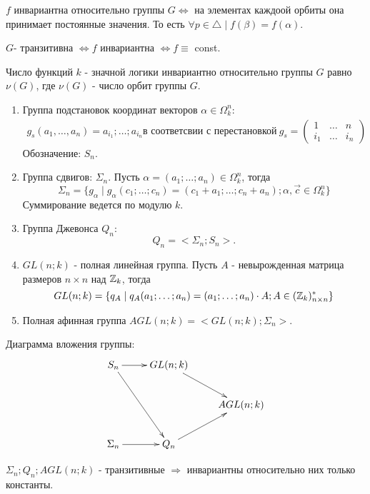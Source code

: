 \utv $f$ инвариантна относительно группы $G \Leftrightarrow$ на элементах каждоой орбиты она принимает постоянные значения.
То есть $\forall p \in \bigtriangleup \mid f(\beta) = f(\alpha)$.

\conseq $G$- транзитивна $\Leftrightarrow f$ инвариантна $\Leftrightarrow f \equiv$ const.

\conseq Число функций $k$ - значной логики инвариантно относительно группы $G$ равно $\nu(G)$, где $\nu(G)$ - число орбит группы $G$.

\examplei
\begin{enumerate}
  \item Группа подстановок координат векторов $\alpha \in \Omega_k^n$:
    \begin{align*}
      g_s(a_1, \dots , a_n)  =  a_{i_1};\dots ;a_{i_n} \text{в соответсвии с перестановкой}\  
      g_s=
      \begin{pmatrix}
        1 & \ldots & n \\
        i_1 & \ldots & i_n
      \end{pmatrix}
  \end{align*}
  Обозначение: $S_n$.

  \item Группа сдвигов: $\Sigma_n $. Пусть $\alpha = (a_1;\dots;a_n) \in \Omega_k^n $, тогда
    $$
      \Sigma_n = \{g_\alpha \mid g_\alpha(c_1; \ldots; c_n)=(c_1+a_1; \ldots; c_n+a_n); \alpha, \vec{c} \in \Omega_k^n\}
    $$
  Суммирование ведется по модулю $k$.

  \item Группа Джевонса $Q_n$:
    $$
      Q_n = <\Sigma_n;S_n>.
    $$
  \item $GL(n;k)$ - полная линейная группа. Пусть $A$ - невырожденная матрица размеров $n \times n $ над $\mathbb{Z}_k$, тогда
  $$
    GL(n;k)=\{q_A \mid q_A(a_1;\ldots;a_n) = (a_1;\ldots;a_n) \cdot A; A \in (\mathbb{Z}_k)_{n \times n}^* \}
  $$

  \item Полная афинная группа $AGL(n;k)=<GL(n;k);\Sigma_n>$.
\end{enumerate}

Диаграмма вложения группы:
\begin{align*}
  \xymatrix{
    S_n      \ar[r] \ar[rdd]  & GL(n; k) \ar[rd] \\
    & & AGL(n;k) \\
    \Sigma_n \ar[r]  & Q_n \ar[ru]
  }
\end{align*}

$\Sigma_n; Q_n; AGL(n;k) $ - транзитивные $\Rightarrow$ инвариантны относительно них только константы.

